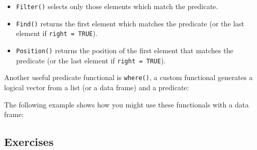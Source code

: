 \begin{itemize}
\item
  \texttt{Filter()} selects only those elements which match the
  predicate. 
\item
  \texttt{Find()} returns the first element which matches the predicate
  (or the last element if \texttt{right = TRUE}). 
\item
  \texttt{Position()} returns the position of the first element that
  matches the predicate (or the last element if \texttt{right = TRUE}).
\end{itemize}

Another useful predicate functional is \texttt{where()}, a custom
functional generates a logical vector from a list (or a data frame) and
a predicate: 

\begin{Shaded}
\begin{Highlighting}[]
\StringTok{ }
  \NormalTok{(}\NormalTok{))}
\NormalTok{\}}
\end{Highlighting}
\end{Shaded}

The following example shows how you might use these functionals with a
data frame:

\begin{Shaded}
\begin{Highlighting}[]
\StringTok{ }\NormalTok{(} \NormalTok{:}\NormalTok{, } \NormalTok{(}\NormalTok{, }\NormalTok{, }\NormalTok{))}
\NormalTok{(}
\NormalTok{(}
\end{Highlighting}
\end{Shaded}

\subsection{Exercises}

